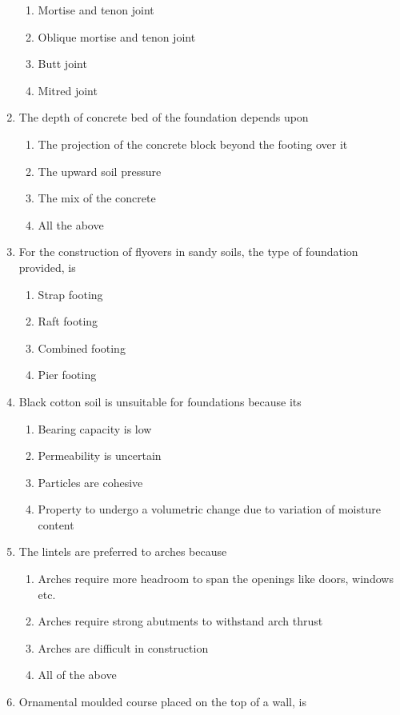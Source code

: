 \documentclass[11pt,a4paper]{article}
\begin{document}
\begin{enumerate}
\begin{enumerate}[label=\Alph*.]
\item{Mortise and tenon joint}
\item{Oblique mortise and tenon joint}
\item{Butt joint}
\item{Mitred joint}
\end{enumerate}
\item{The depth of concrete bed of the foundation depends upon}
\begin{enumerate}[label=\Alph*.]
\item{The projection of the concrete block beyond the footing over it}
\item{The upward soil pressure}
\item{The mix of the concrete}
\item{All the above}
\end{enumerate}
\item{For the construction of flyovers in sandy soils, the type of foundation provided, is}
\begin{enumerate}[label=\Alph*.]
\item{Strap footing}
\item{Raft footing}
\item{Combined footing}
\item{Pier footing}
\end{enumerate}
\item{Black cotton soil is unsuitable for foundations because its}
\begin{enumerate}[label=\Alph*.]
\item{Bearing capacity is low}
\item{Permeability is uncertain}
\item{Particles are cohesive}
\item{Property to undergo a volumetric change due to variation of moisture content}
\end{enumerate}
\item{The lintels are preferred to arches because}
\begin{enumerate}[label=\Alph*.]
\item{Arches require more headroom to span the openings like doors, windows etc.}
\item{Arches require strong abutments to withstand arch thrust}
\item{Arches are difficult in construction}
\item{All of the above}
\end{enumerate}
\item{Ornamental moulded course placed on the top of a wall, is}

\end{enumerate}
\end{document}
